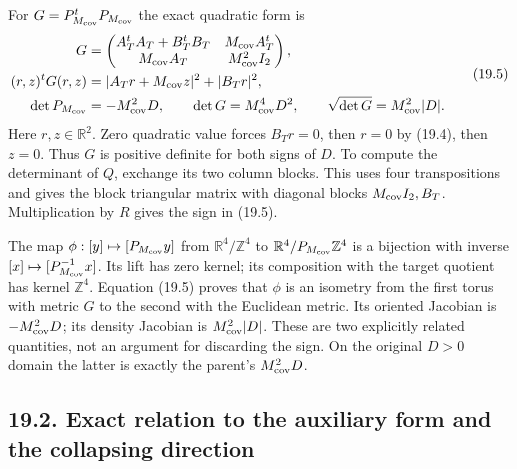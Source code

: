 \documentclass[
]{article}
\begin{document}
For \(G=P_{M_{\rm cov}}^tP_{M_{\rm cov}}\) the exact quadratic form is
\[
\begin{aligned}
G&=\begin{pmatrix}
 A_T^tA_T+B_T^tB_T&M_{\rm cov}A_T^t\\
 M_{\rm cov}A_T&M_{\rm cov}^2I_2
\end{pmatrix},\\
(r,z)^tG(r,z)&=\lvert A_Tr+M_{\rm cov}z\rvert^2+\lvert B_Tr\rvert^2,\\
\det P_{M_{\rm cov}}&=-M_{\rm cov}^2D,\qquad
\det G=M_{\rm cov}^4D^2,\qquad
\sqrt{\det G}=M_{\rm cov}^2|D|.
\end{aligned}                                                    \tag{19.5}
\] Here \(r,z\in\mathbb R^2\). Zero quadratic value forces \(B_Tr=0\),
then \(r=0\) by (19.4), then \(z=0\). Thus \(G\) is positive definite
for both signs of \(D\). To compute the determinant of \(Q\), exchange
its two column blocks. This uses four transpositions and gives the block
triangular matrix with diagonal blocks \(M_{\rm cov}I_2,B_T\).
Multiplication by \(R\) gives the sign in (19.5).

The map \(\phi:[y]\mapsto[P_{M_{\rm cov}}y]\) from
\(\mathbb R^4/\mathbb Z^4\) to
\(\mathbb R^4/P_{M_{\rm cov}}\mathbb Z^4\) is a bijection with inverse
\([x]\mapsto[P_{M_{\rm cov}}^{-1}x]\). Its lift has zero kernel; its
composition with the target quotient has kernel \(\mathbb Z^4\).
Equation (19.5) proves that \(\phi\) is an isometry from the first torus
with metric \(G\) to the second with the Euclidean metric. Its oriented
Jacobian is \(-M_{\rm cov}^2D\); its density Jacobian is
\(M_{\rm cov}^2|D|\). These are two explicitly related quantities, not
an argument for discarding the sign. On the original \(D>0\) domain the
latter is exactly the parent's \(M_{\rm cov}^2D\).

\subsection{19.2. Exact relation to the auxiliary form and the
collapsing
direction}\label{exact-relation-to-the-auxiliary-form-and-the-collapsing-direction}
\end{document}
